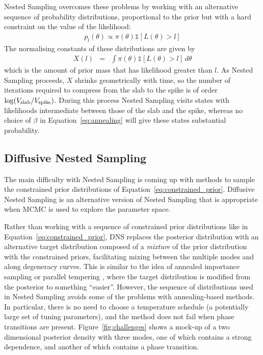 \documentclass[letterpaper, 11pt]{article}
\begin{document}
Nested Sampling \citep{skilling} overcomes these problems by working with an
alternative sequence of probability distributions, proportional to the prior
but with a hard constraint on the value of the likelihood:
\begin{eqnarray}
p_{l}(\theta) \propto \pi(\theta)\mathds{1}\left[L(\theta) > l\right]\label{eq:constrained_prior}
\end{eqnarray}
The normalising constants of these distributions are given by
\begin{eqnarray}
X(l) &=& \int \pi(\theta)\mathds{1}\left[L(\theta) > l\right] \, d\theta
\end{eqnarray}
which is the amount of prior mass that has likelihood greater than
$l$. As Nested Sampling proceeds, $X$ shrinks geometrically with time, so
the number of iterations required to compress from the slab to the spike is
of order $\log(V_{\rm slab}/V_{\rm spike})$. During this process Nested Sampling
visits states with likelihoods intermediate between those of the slab and the
spike, whereas no choice of $\beta$ in Equation~\ref{eq:annealing} will give
these states substantial probability.

\subsection{Diffusive Nested Sampling}
The main difficulty with Nested Sampling is coming up with methods to sample
the constrained prior distributions of Equation~\ref{eq:constrained_prior}.
Diffusive Nested Sampling
\citep[DNS][]{dnest} is an alternative version of Nested Sampling that is
appropriate when MCMC is used to explore the parameter space.

Rather than working with a sequence of constrained prior distributions like in
Equation~\ref{eq:constrained_prior}, DNS
replaces the posterior distribution with an alternative target
distribution composed of a {\it mixture} of the prior distribution with the
constrained priors, facilitating mixing between the multiple modes
and along degeneracy curves.
This is similar to the idea of annealed importance sampling
\citep{neal} or parallel tempering \citep{pt},
where the target distribution is modified from the posterior to something
``easier''. However,
the sequence of distributions used in Nested Sampling avoids some of the
problems with annealing-based methods. In particular, there is no need to choose
a temperature schedule (a potentially large set of tuning parameters),
and the method does not fail when phase transitions
are present.
Figure~\ref{fig:challenges} shows a mock-up of a two dimensional posterior
density with three modes, one of which contains a strong dependence, and
another of which contains a phase transition.
\end{document}
